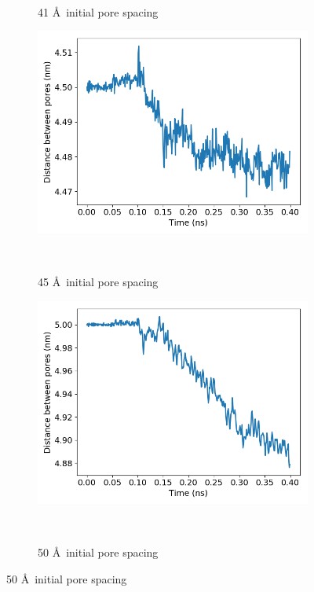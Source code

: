 \documentclass{article}
\begin{document}
\begin{enumerate}
\begin{figure}[htp]
\begin{subfigure}{0.3\textwidth}
			\vspace{-1.25em}
			\caption{41 \AA~initial pore spacing}~\label{fig:p2p_41}
		\end{subfigure}
		\begin{subfigure}{0.3\textwidth}
			\includegraphics[width=\textwidth]{p2p_45.png}
			\vspace{-1.25em}
			\caption{45 \AA~initial pore spacing}~\label{fig:p2p_45}
		\end{subfigure}
		\begin{subfigure}{0.3\textwidth}
			\includegraphics[width=\textwidth]{p2p_50.png}\quad	
			\vspace{-1.25em}
			\caption{50 \AA~initial pore spacing}~\label{fig:p2p_50}
		\end{subfigure}

\end{figure}
\end{enumerate}
\end{document}
